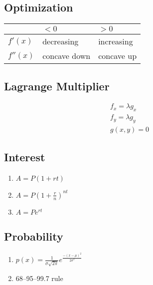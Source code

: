 \documentclass[letterpaper,12pt,fleqn]{article}
\begin{document}
\begin{minipage}{3in}
  \subsection*{Optimization}

  \begin{tabular}{|l|l|l|}
    \hline
    & \(<0\) & \(>0\) \\
    \hline
    \(f'(x)\) & decreasing & increasing \\
    \hline
    \(f''(x)\) & concave down & concave up \\
    \hline
  \end{tabular}
\end{minipage}
\begin{minipage}{3in}
  \subsection*{Lagrange Multiplier}
  \begin{gather*}
    f_x=\lambda g_x \\
    f_y=\lambda g_y \\
    g(x,y)=0
  \end{gather*}
\end{minipage}

\begin{minipage}{3in}
\subsection*{Interest}

\begin{enumerate}[left=0pt]
\item \(A=P(1+rt)\)
\item \(A=P\left(1+\frac{r}{n}\right)^{nt}\)
\item \(A=Pe^{rt}\)
\end{enumerate}
\end{minipage}
\begin{minipage}{3in}
\subsection*{Probability}

\begin{enumerate}[left=0pt]
  \setlength{\itemsep}{5pt}
\item \(\displaystyle p(x)=\frac{1}{\sigma\sqrt{2\pi}}e^{\frac{-(x-\mu)^2}{2\sigma^2}}\)
\item 68--95--99.7 rule
\end{enumerate}
\end{minipage}
\end{document}
